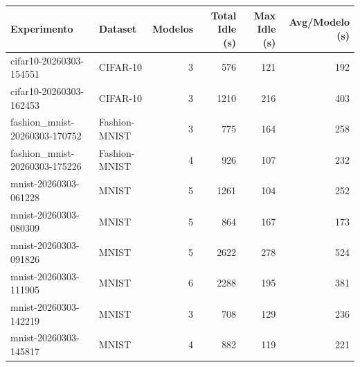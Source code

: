 \begin{tabular}{llrrrr}
\toprule
Experimento & Dataset & Modelos & Total Idle (s) & Max Idle (s) & Avg/Modelo (s) \\
\midrule
cifar10-20260303-154551 & CIFAR-10 & 3 & 576 & 121 & 192 \\
cifar10-20260303-162453 & CIFAR-10 & 3 & 1210 & 216 & 403 \\
fashion_mnist-20260303-170752 & Fashion-MNIST & 3 & 775 & 164 & 258 \\
fashion_mnist-20260303-175226 & Fashion-MNIST & 4 & 926 & 107 & 232 \\
mnist-20260303-061228 & MNIST & 5 & 1261 & 104 & 252 \\
mnist-20260303-080309 & MNIST & 5 & 864 & 167 & 173 \\
mnist-20260303-091826 & MNIST & 5 & 2622 & 278 & 524 \\
mnist-20260303-111905 & MNIST & 6 & 2288 & 195 & 381 \\
mnist-20260303-142219 & MNIST & 3 & 708 & 129 & 236 \\
mnist-20260303-145817 & MNIST & 4 & 882 & 119 & 221 \\
\bottomrule
\end{tabular}